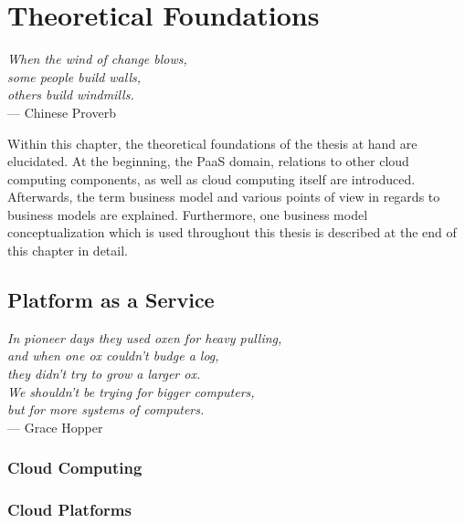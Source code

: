 \chapter{Theoretical Foundations}\label{ch:tf}

\begin{flushright}{\slshape    
	When the wind of change blows,\\
	some people build walls,\\
	others build windmills.} \\ \medskip
	--- Chinese Proverb
\end{flushright}

Within this chapter, the theoretical foundations of the thesis at hand are elucidated. At the beginning, the \ac{PaaS} domain, relations to other cloud computing components, as well as cloud computing itself are introduced. Afterwards, the term business model and various points of view in regards to business models are explained. Furthermore, one business model conceptualization which is used throughout this thesis is described at the end of this chapter in detail. 

\section{Platform as a Service}\label{ch:tf:paas}
\begin{flushright}{\slshape 
	In pioneer days they used oxen for heavy pulling,\\
	and when one ox couldn't budge a log,\\
	they didn't try to grow a larger ox.\\
	We shouldn't be trying for bigger computers,\\
	but for more systems of computers.} \\ \medskip
	--- Grace Hopper
\end{flushright}

\subsection{Cloud Computing}

\subsection{Cloud Platforms}

